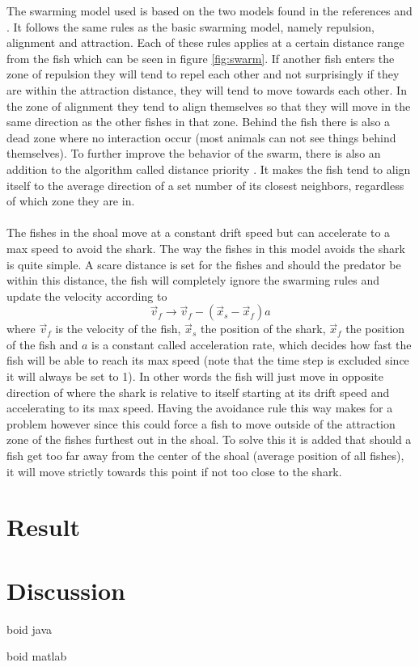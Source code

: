 \documentclass[12pt,A4]{article}
\begin{document}
The swarming model used is based on the two models found in the references \cite{javafish} and \cite{matlabfish}. It follows the same rules as the basic swarming model, namely repulsion, alignment and attraction. Each of these rules applies at a certain distance range from the fish which can be seen in figure \ref{fig:swarm}. If another fish enters the zone of repulsion they will tend to repel each other and not surprisingly if they are within the attraction distance, they will tend to move towards each other. In the zone of alignment they tend to align themselves so that they will move in the same direction as the other fishes in that zone. Behind the fish there is also a dead zone where no interaction occur (most animals can not see things behind themselves). To further improve the behavior of the swarm, there is also an addition to the algorithm called distance priority \cite{matlabfish}. It makes the fish tend to align itself to the average direction of a set number of its closest neighbors, regardless of which zone they are in.\\
\\
The fishes in the shoal move at a constant drift speed but can accelerate to a max speed to avoid the shark. The way the fishes in this model avoids the shark is quite simple. A scare distance is set for the fishes and should the predator be within this distance, the fish will completely ignore the swarming rules and update the velocity according to
\begin{equation}
\vec{v}_f \rightarrow \vec{v}_f - (\vec{x}_s - \vec{x}_f)a
\end{equation}
where $\vec{v}_f$ is the velocity of the fish, $\vec{x}_s$ the position of the shark, $\vec{x}_f$ the position of the fish and $a$ is a constant called acceleration rate, which decides how fast the fish will be able to reach its max speed (note that the time step is excluded since it will always be set to 1). In other words the fish will just move in opposite direction of where the shark is relative to itself starting at its drift speed and accelerating to its max speed. Having the avoidance rule this way makes for a problem however since this could force a fish to move outside of the attraction zone of the fishes furthest out in the shoal. To solve this it is added that should a fish get too far away from the center of the shoal (average position of all fishes), it will move strictly towards this point if not too close to the shark.

\section{Result}

\section{Discussion}



\begin{thebibliography}{99}
 boid java

 boid matlab

\end{thebibliography}
\end{document}
